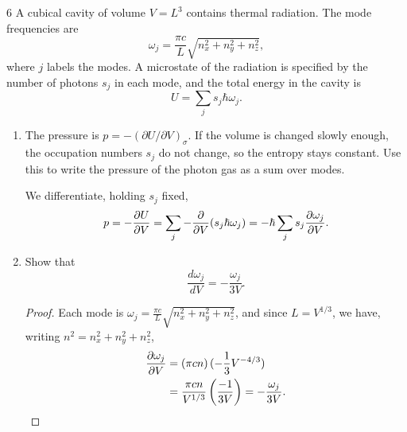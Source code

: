\documentclass[11pt]{article}
\begin{document}
\begin{problem}{6}
A cubical cavity of volume \( V = L^3 \) contains thermal radiation.
The mode frequencies are
\begin{equation}
  \label{eq:p6-mode-frequencies}
  \omega_j = \frac{\pi c}{L}\sqrt{n_x^2+n_y^2+n_z^2},
\end{equation}
where \( j \) labels the modes.
A microstate of the radiation is specified by the number of photons \( s_j \) in each mode, and the total energy in the cavity is
\begin{equation}
  \label{eq:p6-cavity-energy}
  U = \sum_j s_j\hbar\omega_j.
\end{equation}
\begin{enumerate}[label=(\alph*)]
  \item The pressure is \( p = -(\partial U/\partial V)_{\sigma} \).
  If the volume is changed slowly enough, the occupation numbers \( s_j \) do not change, so the entropy stays constant.
  Use this to write the pressure of the photon gas as a sum over modes.
        \begin{answer}
          We differentiate, holding \( s_j \) fixed,
          \begin{equation}
          \label{eq:12}
          p = - \pdv{U}{V} = \sum\limits_j-\pdv{V}(s_j\hbar\omega_{j}) = -\hbar \sum\limits_j s_j \pdv{\omega_j}{V}.
          \end{equation}
        \end{answer}

  \item Show that
  \begin{equation}
    \label{eq:p6-frequency-volume-derivative}
    \frac{d\omega_j}{dV} = -\frac{\omega_j}{3V}.
  \end{equation}
        \begin{proof}
          Each mode is \(\omega_j = \frac{\pi c}{L}\sqrt{n_{x}^2 + n_y^2 + n_z^2}\), and since \( L = V^{1/3} \), we have, writing \( n^2 = n_x^2 + n_y^2 + n_z^2 \),
          \begin{equation}
          \label{eq:13}
          \begin{aligned}
            \pdv{\omega_j}{V} &= \left( \pi c n \right) (- \frac{1}{3}V^{-4/3}) \\
            &= \frac{\pi c n}{V^{1/3}} \left(\frac{-1}{3V}\right) = -\frac{\omega_j}{3V}.
          \end{aligned}
          \end{equation}
        \end{proof}


\end{enumerate}
\end{problem}
\end{document}
